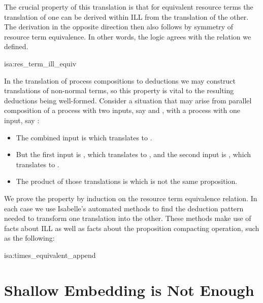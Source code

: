 \documentclass[class=smolathesis,crop=false]{standalone}
\begin{document}
The crucial property of this translation is that for equivalent resource terms the translation of one can be derived within ILL from the translation of the other.
The derivation in the opposite direction then also follows by symmetry of resource term equivalence.
In other words, the logic agrees with the relation we defined.

\pagebreak
\begin{isalemma}{isa:res_term_ill_equiv}
  
\end{isalemma}

In the translation of process compositions to deductions we may construct translations of non-normal terms, so this property is vital to the resulting deductions being well-formed.
Consider a situation that may arise from parallel composition of a process with two inputs, say  and , with a process with one input, say :
\begin{itemize}
  \item The combined input is  which translates to .
  \item But the first input is , which translates to , and the second input is , which translates to .
  \item The product of those translations is  which is not the same proposition.
\end{itemize}

We prove the property by induction on the resource term equivalence relation.
In each case we use Isabelle's automated methods to find the deduction pattern needed to transform one translation into the other.
These methods make use of facts about ILL as well as facts about the proposition compacting operation, such as the following:
\begin{isalemma}{isa:times_equivalent_append}
  
\end{isalemma}

\section{Shallow Embedding is Not Enough}
\label{sec:linearity/not-enough}
\end{document}
